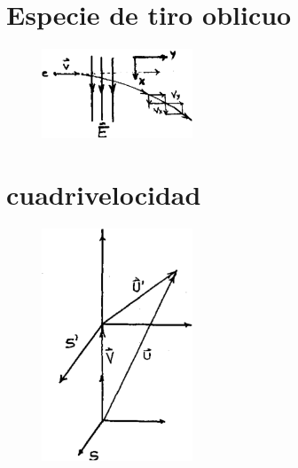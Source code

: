 \documentclass[10pt,oneside]{CBFT_book}
\begin{document}
\section{Especie de tiro oblicuo}

\begin{figure}[htb]
	\begin{center}
	\includegraphics[width=0.4\textwidth]{images/fig_ft1_tirooblicuo.pdf}	 
	\end{center}
	\caption{}
\end{figure} 

\section{cuadrivelocidad}


\begin{figure}[htb]
	\begin{center}
	\includegraphics[width=0.4\textwidth]{images/fig_ft1_4vel.pdf}	 
	\end{center}
	\caption{}
\end{figure} 

\end{document}
